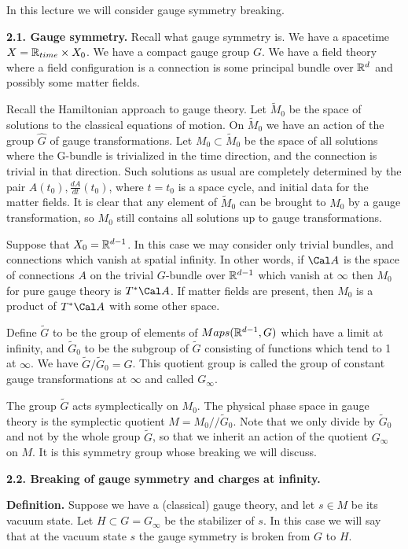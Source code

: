 In this lecture we will consider gauge symmetry breaking. 

{\bf 2.1. Gauge symmetry.} 
Recall what gauge symmetry is. We have a spacetime $X=\Bbb R_{time}\times
X_0$. We have a compact gauge group $G$. 
We have a field theory where a field configuration
is a connection is some principal bundle over $\Bbb R^d$ and possibly 
some matter fields. 

Recall the Hamiltonian approach to gauge theory. 
Let $\tilde M_0$ be the space of solutions to the classical 
equations of motion. On $\tilde M_0$ we have an action 
of the group $\hat G$ of gauge transformations. 
Let $M_0\subset \tilde M_0$ be the space of all solutions 
where the G-bundle is trivialized in the time direction, and 
the connection is trivial in that direction. Such solutions 
as usual are completely determined by the pair $A(t_0),\frac{dA}{dt}(t_0)$, 
where $t=t_0$ is a space cycle, and initial data for the matter fields. 
It is clear that any element of $\tilde M_0$ 
can be brought to $M_0$ by a gauge transformation, so 
$M_0$ still contains all solutions up to gauge transformations.      

Suppose that $X_0=\Bbb R^{d-1}$. In this case we may consider only trivial 
bundles, and connections which vanish at spatial infinity. 
In other words, if $\Cal A$ 
is the space of connections $A$ on the trivial $G$-bundle over $\Bbb R^{d-1}$
which vanish at $\infty$ then $M_0$ for pure gauge theory is 
$T^*\Cal A$. If matter fields are present, then $M_0$ is a product of 
$T^*\Cal A$ with some other space. 

Define $\tilde G$ to be 
the group of elements of $Maps(\Bbb R^{d-1},G)$ 
which have a limit at infinity, and $\tilde G_0$ to be the subgroup of
$\tilde G$ consisting of functions which tend to 1 at $\infty$. 
We have $\tilde G/\tilde G_0=G$. This quotient group is called the group 
of constant gauge transformations at $\infty$ and called $G_\infty$. 

The group $\tilde G$ acts symplectically on $M_0$. 
The physical phase space in gauge theory is the symplectic quotient
$M=M_0//\tilde G_0$. Note that we only divide by $\tilde G_0$ and not by
the whole group $\tilde G$, so that we inherit an action 
of the quotient $G_\infty$ on $M$. It is this symmetry group whose
breaking we will discuss. 

{\bf 2.2. Breaking of gauge symmetry 
and charges at infinity.}

{\bf Definition.} Suppose we have a (classical) gauge theory, and 
let $s\in M$ be its vacuum state. Let $H\subset G=G_\infty$ be 
the stabilizer of $s$. In this case  
we will say that at the vacuum state $s$  the gauge 
symmetry is broken from $G$ to $H$.

